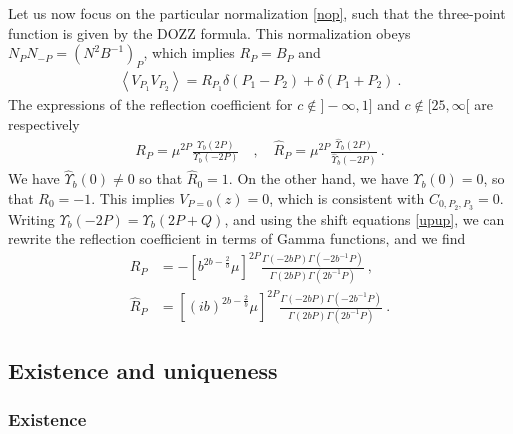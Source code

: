 \documentclass[12pt, a4paper, notitlepage, twoside]{report}
\numberwithin{equation}{section}
\theoremstyle{break}
\begin{document}
Let us now focus on the particular normalization \eqref{nop}, such that the three-point function is given by the DOZZ formula. This normalization obeys $N_PN_{-P} = \left(N^2B^{-1}\right)_P$, which implies $R_P=B_P$ and 
\begin{align}
 \left<V_{P_1}V_{P_2}\right> = R_{P_1}\delta(P_1-P_2) + \delta(P_1+P_2)\ .
 \label{vvrdd}
\end{align}
The expressions of the reflection coefficient for $c\notin ]-\infty, 1]$ and $c\notin [25,\infty[$ are respectively
\begin{align}
 R_P = \mu^{2P}\frac{\Upsilon_b(2P)}{\Upsilon_b(-2P)} \quad , \quad \hat R_P = \mu^{2P}\frac{\hat{\Upsilon}_b(2P)}{\hat{\Upsilon}_b(-2P)}\ .
 \end{align}
We have  $\hat\Upsilon_b(0)\neq 0$ so that $\hat R_0=1$. On the other hand, we have $\Upsilon_b(0)=0$, so that $R_0=-1$. This implies $V_{P=0}(z)=0$, which is consistent with $C_{0,P_2,P_3}=0$.
Writing $\Upsilon_b(-2P)=\Upsilon_b(2P+Q)$, and using the shift equations \eqref{upup}, we can rewrite the reflection coefficient in terms of Gamma functions, and we find 
\begin{align}
 R_P &= -\left[b^{2b-\frac{2}{b}}\mu\right]^{2P} \frac{\Gamma(-2bP)\Gamma(-2b^{-1}P)}{\Gamma(2bP)\Gamma(2b^{-1}P)} \ ,
 \label{ram}
\\
 \hat R_P &= \left[(ib)^{2b-\frac{2}{b}}\mu\right]^{2P} \frac{\Gamma(-2bP)\Gamma(-2b^{-1}P)}{\Gamma(2bP)\Gamma(2b^{-1}P)} \ .
\end{align}


\subsection{Existence and uniqueness}\label{seceul}

\subsubsection{Existence}
\end{document}
